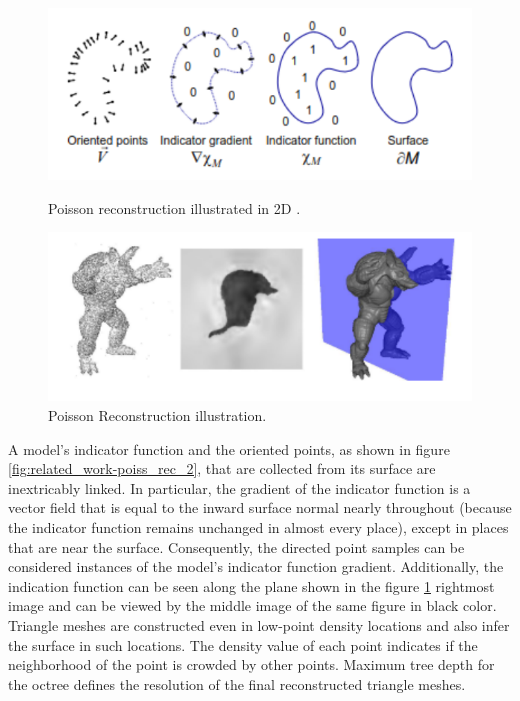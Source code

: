 \begin{figure}[htbp]
    \centering
    \begin{minipage}[b]{0.45\textwidth}
    \centering
    \includegraphics[width=1\linewidth]{97_graphics/related_work/poisson_reconstruction_2.pdf}
    \caption{Poisson reconstruction illustrated in 2D \parencite{kazhdan2006poisson}.}
    \label{fig:related_work-poiss_rec_2}
    \end{minipage}
    \hfill
    \begin{minipage}[b]{0.45\textwidth}
    \centering
    \includegraphics[width=1\linewidth]{97_graphics/related_work/poisson_reconstruction_1.pdf}
    \caption{Poisson Reconstruction illustration.\parencite{kazhdan2006poisson}}
    \label{fig:related_work-poiss_rec_1}
    \end{minipage}
\end{figure}

A model's indicator function and the oriented points, as shown in figure \ref{fig:related_work-poiss_rec_2}, that are collected from its surface are inextricably linked. In particular, the gradient of the indicator function is a vector field that is equal to the inward surface normal nearly throughout (because the indicator function remains unchanged in almost every place), except in places that are near the surface. Consequently, the directed point samples can be considered instances of the model's indicator function gradient. Additionally, the indication function can be seen along the plane shown in the figure \ref{fig:related_work-poiss_rec_1} rightmost image and can be viewed by the middle image of the same figure in black color. Triangle meshes are constructed even in low-point density locations and also infer the surface in such locations. The density value of each point indicates if the neighborhood of the point is crowded by other points. Maximum tree depth for the octree defines the resolution of the final reconstructed triangle meshes.


